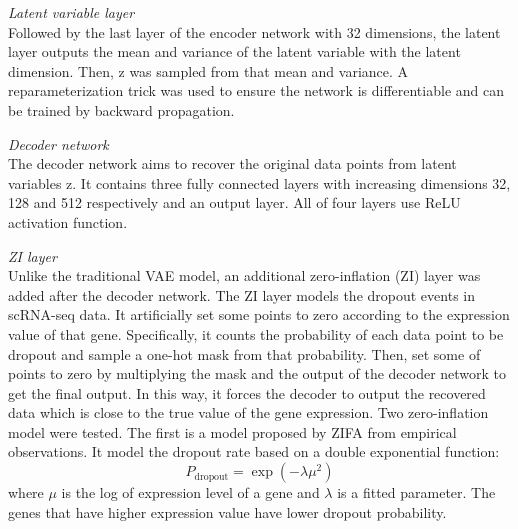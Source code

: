 \vspace{0.5cm}
\noindent\emph{Latent variable layer} \\
Followed by the last layer of the encoder network with 32 dimensions, the latent layer outputs the mean and variance of the latent variable with the latent dimension. Then, z was sampled from that mean and variance. A reparameterization trick was used to ensure the network is differentiable and can be trained by backward propagation.

\vspace{0.5cm}
\noindent\emph{Decoder network} \\
The decoder network aims to recover the original data points from latent variables z. It contains three fully connected layers with increasing dimensions 32, 128 and 512 respectively and an output layer. All of four layers use ReLU activation function. 

\vspace{0.5cm}
\noindent\emph{ZI layer} \\
Unlike the traditional VAE model, an additional zero-inflation (ZI) layer was added after the decoder network. The ZI layer models the dropout events in scRNA-seq data. It artificially set some points to zero according to the expression value of that gene. Specifically, it counts the probability of each data point to be dropout and sample a one-hot mask from that probability. Then, set some of points to zero by multiplying the mask and the output of the decoder network to get the final output. In this way, it forces the decoder to output the recovered data which is close to the true value of the gene expression. Two zero-inflation model were tested. The first is a model proposed by ZIFA \cite{Pierson2015} from empirical observations. It model the dropout rate based on a double exponential function: 
\begin{equation}
    P_{\text {dropout}}=\exp \left(-\lambda \mu^{2}\right)
\end{equation}
where $\mu$ is the log of expression level of a gene and $\lambda$ is a fitted parameter. The genes that have higher expression value have lower dropout probability.  

